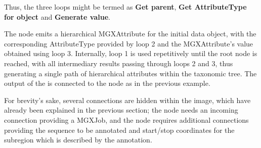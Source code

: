 Thus, the three loops might be termed as \textbf{Get parent}, \textbf{Get AttributeType for object} and
\textbf{Generate value}. 

The  node emits a hierarchical MGXAttribute for the initial data object,
with the corresponding AttributeType provided by loop 2 and the MGXAttribute's value obtained using loop 3.
Internally, loop 1 is used repetitively until the root node is reached, with all intermediary results
passing through loops 2 and 3, thus generating a single path of hierarchical attributes within the taxonomic
tree. The output of the  is connected to the 
node as in the previous example.

For brevity's sake, several connections are hidden within the image, which have already been explained in the
previous section; the  node needs an incoming connection providing a MGXJob,
and the  node requires additional connections providing the sequence to be annotated
and start/stop coordinates for the subregion which is described by the annotation.



